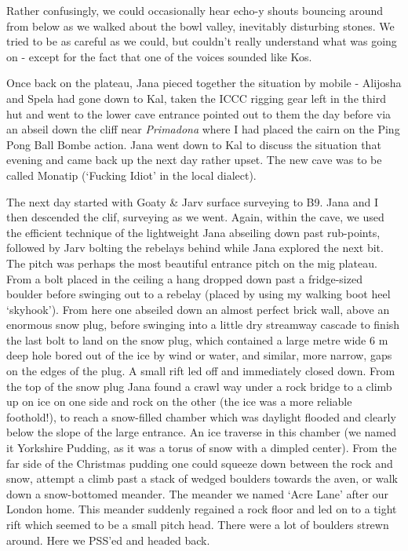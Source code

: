Rather confusingly, we could occasionally hear echo-y shouts bouncing
around from below as we walked about the bowl valley, inevitably
disturbing stones. We tried to be as careful as we could, but couldn't
really understand what was going on - except for the fact that one of
the voices sounded like Kos.

Once back on the plateau, Jana pieced together the situation by mobile -
Alijosha and Spela had gone down to Kal, taken the ICCC rigging gear
left in the third hut and went to the lower cave entrance pointed out to
them the day before via an abseil down the cliff near \emph{Primadona}
where I had placed the cairn on the Ping Pong Ball Bombe action. Jana
went down to Kal to discuss the situation that evening and came back up
the next day rather upset. The new cave was to be called Monatip
(`Fucking Idiot' in the local dialect).

The next day started with Goaty \& Jarv surface surveying to B9. Jana
and I then descended the clif, surveying as we went. Again, within the
cave, we used the efficient technique of the lightweight Jana abseiling
down past rub-points, followed by Jarv bolting the rebelays behind while
Jana explored the next bit. The pitch was perhaps the most beautiful
entrance pitch on the mig plateau. From a bolt placed in the ceiling a
hang dropped down past a fridge-sized boulder before swinging out to a
rebelay (placed by using my walking boot heel `skyhook'). From here one
abseiled down an almost perfect brick wall, above an enormous snow plug,
before swinging into a little dry streamway cascade to finish the last
bolt to land on the snow plug, which contained a large metre wide 6 m
deep hole bored out of the ice by wind or water, and similar, more
narrow, gaps on the edges of the plug. A small rift led off and
immediately closed down. From the top of the snow plug Jana found a
crawl way under a rock bridge to a climb up on ice on one side and rock
on the other (the ice was a more reliable foothold!), to reach a
snow-filled chamber which was daylight flooded and clearly below the
slope of the large entrance. An ice traverse in this chamber (we named
it Yorkshire Pudding, as it was a torus of snow with a dimpled center).
From the far side of the Christmas pudding one could squeeze down
between the rock and snow, attempt a climb past a stack of wedged
boulders towards the aven, or walk down a snow-bottomed meander. The
meander we named `Acre Lane' after our London home. This meander
suddenly regained a rock floor and led on to a tight rift which seemed
to be a small pitch head. There were a lot of boulders strewn around.
Here we PSS'ed and headed back.

